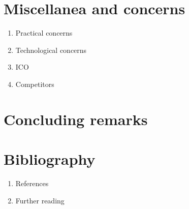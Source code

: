 \documentclass[a4paper,11pt]{article}
\begin{document}
   
\section{Miscellanea and concerns}
   \begin{enumerate}
     \item Practical concerns
     \item Technological concerns
     \item ICO
     \item Competitors
   \end{enumerate}
   
   
\section{Concluding remarks}
   \begin{enumerate}
   \end{enumerate}
   
   
   
\section{Bibliography}
   \begin{enumerate}
     \item References
     \item Further reading
   \end{enumerate}
   
         
\end{document}
